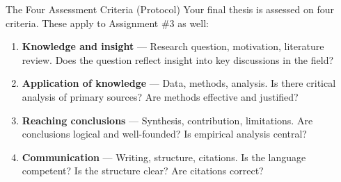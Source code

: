 \documentclass[aspectratio=169,11pt]{beamer}
\begin{document}
\begin{frame}{The Four Assessment Criteria (Protocol)}
    Your final thesis is assessed on four criteria. These apply to Assignment \#3 as well:
    \vspace{0.3cm}
    \begin{enumerate}
        \item \textbf{Knowledge and insight} --- Research question, motivation, literature review. Does the question reflect insight into key discussions in the field?
        \vspace{0.15cm}
        \item \textbf{Application of knowledge} --- Data, methods, analysis. Is there critical analysis of primary sources? Are methods effective and justified?
        \vspace{0.15cm}
        \item \textbf{Reaching conclusions} --- Synthesis, contribution, limitations. Are conclusions logical and well-founded? Is empirical analysis central?
        \vspace{0.15cm}
        \item \textbf{Communication} --- Writing, structure, citations. Is the language competent? Is the structure clear? Are citations correct?
    \end{enumerate}
\end{frame}
\end{document}
